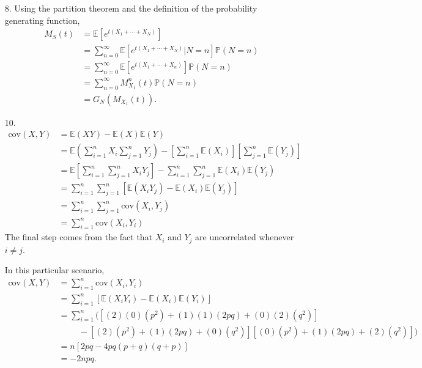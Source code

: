 \documentclass[a4paper,12pt]{article}
\begin{document}
\begin{enumerate}
    \item[8.] 
        Using the partition theorem and the definition of the probability generating function,
        \begin{align*}
            M_S(t) &= \mathbb{E} \left[ e^{t(X_1 + \cdots + X_N)} \right] \\
            &= \sum_{n = 0}^\infty \mathbb{E} \left[ e^{t(X_1 + \cdots + X_N)} | N = n \right] \mathbb{P}(N = n) \\
            &= \sum_{n = 0}^\infty \mathbb{E} \left[ e^{t(X_1 + \cdots + X_n)} \right] \mathbb{P}(N = n) \\
            &= \sum_{n = 0}^\infty M_{X_1}^n(t) \mathbb{P}(N = n) \\
            &= G_N(M_{X_1}(t)).
        \end{align*}

    \item[10.] 
        \begin{align*}
            \text{cov}(X, Y) &= \mathbb{E}(XY) - \mathbb{E}(X) \mathbb{E}(Y) \\
            &= \mathbb{E} \left( \sum_{i = 1}^n X_i \sum_{j = 1}^n Y_j \right) - \left[ \sum_{i = 1}^n \mathbb{E}(X_i) \right] \left[ \sum_{j = 1}^n \mathbb{E}(Y_j) \right] \\
            &= \mathbb{E} \left[ \sum_{i = 1}^n \sum_{j = 1}^n X_i Y_j \right] - \sum_{i = 1}^n \sum_{j = 1}^n \mathbb{E}(X_i) \mathbb{E}(Y_j) \\
            &= \sum_{i = 1}^n \sum_{j = 1}^n [ \mathbb{E}(X_i Y_j) - \mathbb{E}(X_i) \mathbb{E}(Y_j) ] \\
            &= \sum_{i = 1}^n \sum_{j = 1}^n \text{cov}(X_i, Y_j) \\
            &= \sum_{i = 1}^n \text{cov}(X_i, Y_i)
        \end{align*}
        The final step comes from the fact that $X_i$ and $Y_j$ are uncorrelated whenever $i \neq j$. \par
        In this particular scenario,
        \begin{align*}
            \text{cov}(X, Y) &= \sum_{i = 1}^n \text{cov}(X_i, Y_i) \\
            &= \sum_{i = 1}^n [\mathbb{E}(X_i Y_i) - \mathbb{E}(X_i) \mathbb{E}(Y_i)] \\
            &= \sum_{i = 1}^n \bigl( [(2)(0)(p^2) + (1)(1)(2pq) + (0)(2)(q^2)] \\
            &\hspace{1cm}- [(2)(p^2) + (1)(2pq) + (0)(q^2)][(0)(p^2) + (1)(2pq) + (2)(q^2)] \bigr) \\
            &= n[2pq - 4pq(p + q)(q + p)] \\
            &= -2npq.
        \end{align*}


\end{enumerate}
\end{document}
